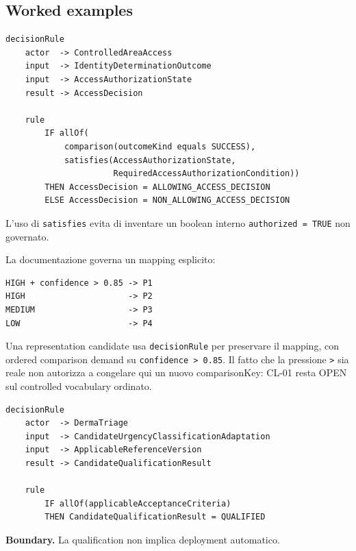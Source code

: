 \documentclass[11pt,a4paper]{article}
\begin{document}
\subsection{Worked examples}
\begin{ddtaexample}[title={Facial Access - AccessDecision condizionata a identity outcome e authorization condition}]
\begin{lstlisting}
decisionRule
    actor  -> ControlledAreaAccess
    input  -> IdentityDeterminationOutcome
    input  -> AccessAuthorizationState
    result -> AccessDecision

    rule
        IF allOf(
            comparison(outcomeKind equals SUCCESS),
            satisfies(AccessAuthorizationState,
                      RequiredAccessAuthorizationCondition))
        THEN AccessDecision = ALLOWING_ACCESS_DECISION
        ELSE AccessDecision = NON_ALLOWING_ACCESS_DECISION
\end{lstlisting}
L'uso di \texttt{satisfies} evita di inventare un boolean interno \texttt{authorized = TRUE} non governato.
\end{ddtaexample}

\begin{ddtaexample}[title={DermaTriage - FR-02: mapping P-scale}]
La documentazione governa un mapping esplicito:
\begin{lstlisting}
HIGH + confidence > 0.85 -> P1
HIGH                     -> P2
MEDIUM                   -> P3
LOW                      -> P4
\end{lstlisting}
Una representation candidate usa \texttt{decisionRule} per preservare il mapping, con ordered comparison demand su \texttt{confidence > 0.85}. Il fatto che la pressione \texttt{>} sia reale non autorizza a congelare qui un nuovo comparisonKey: CL-01 resta OPEN sul controlled vocabulary ordinato.
\end{ddtaexample}

\begin{ddtaexample}[title={DermaTriage - FR-09: tutti i criteri applicabili devono essere soddisfatti}]
\begin{lstlisting}
decisionRule
    actor  -> DermaTriage
    input  -> CandidateUrgencyClassificationAdaptation
    input  -> ApplicableReferenceVersion
    result -> CandidateQualificationResult

    rule
        IF allOf(applicableAcceptanceCriteria)
        THEN CandidateQualificationResult = QUALIFIED
\end{lstlisting}
\textbf{Boundary.} La qualification non implica deployment automatico.
\end{ddtaexample}
\end{document}
